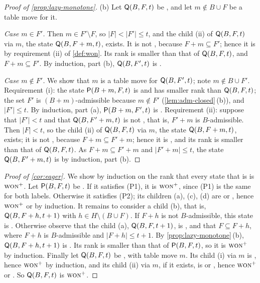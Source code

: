 \begin{proof}[Proof of \cref{prop:lazy-monotone}]
(b) Let $\mathsf{Q}(B,F,t)$ be \WON, and let $m\notin B\cup F$ be a table move for it.

\emph{Case $m\in F'$.} Then $m\in F'\setminus F$, so $|F|<|F'|\le t$, and the child \textup{(ii)} of
$\mathsf{Q}(B,F,t)$ via $m$, the state $\mathsf{Q}(B,F+m,t)$, exists. It is not \VOID, because $F+m\subseteq F'$; hence
it is \WON{} by requirement (ii) of \cref{def:won}. Its rank is smaller than that of $\mathsf{Q}(B,F,t)$,
and $F+m\subseteq F'$. By induction, part (b), $\mathsf{Q}(B,F',t)$ is \WON.

\emph{Case $m\notin F'$.} We show that $m$ is a table move for $\mathsf{Q}(B,F',t)$; note $m\notin B\cup F'$.
Requirement (i): the state $\mathsf{P}(B+m,F,t)$ is \WON{} and has smaller rank than $\mathsf{Q}(B,F,t)$; the set $F'$ is
$(B+m)$-admissible because $m\notin F'$ (\cref{lem:adm-closed}\,(b)), and $|F'|\le t$. By induction, part
(a), $\mathsf{P}(B+m,F',t)$ is \WON. Requirement (ii): suppose that $|F'|<t$ and that $\mathsf{Q}(B,F'+m,t)$ is not
\VOID, that is, $F'+m$ is $B$-admissible. Then $|F|<t$, so the child \textup{(ii)} of $\mathsf{Q}(B,F,t)$ via $m$,
the state $\mathsf{Q}(B,F+m,t)$, exists; it is not \VOID, because $F+m\subseteq F'+m$; hence it is \WON, and its
rank is smaller than that of $\mathsf{Q}(B,F,t)$. As $F+m\subseteq F'+m$ and $|F'+m|\le t$, the state
$\mathsf{Q}(B,F'+m,t)$ is \WON{} by induction, part (b).
\end{proof}

\begin{proof}[Proof of \cref{cor:eager}]
We show by induction on the rank that every state that is \WON{} is $\textup{\textsc{won}}^{+}$. Let $\mathsf{P}(B,F,t)$ be \WON. If
it satisfies (P1), it is $\textup{\textsc{won}}^{+}$, since (P1) is the same for both labels. Otherwise it satisfies (P2); its
children \textup{(a)}, \textup{(c)}, \textup{(d)} are \WON{} or \VOID, hence $\textup{\textsc{won}}^{+}$ or \VOID{} by induction.
It remains to consider a child \textup{(b)}, that is, $\mathsf{Q}(B,F+h,t+1)$ with $h\in H\setminus(B\cup F)$. If
$F+h$ is not $B$-admissible, this state is \VOID. Otherwise observe that the child \textup{(a)},
$\mathsf{Q}(B,F,t+1)$, is \WON, and that $F\subseteq F+h$, where $F+h$ is $B$-admissible and $|F+h|\le t+1$. By
\cref{prop:lazy-monotone}\,(b), $\mathsf{Q}(B,F+h,t+1)$ is \WON. Its rank is smaller than that of
$\mathsf{P}(B,F,t)$, so it is $\textup{\textsc{won}}^{+}$ by induction. Finally let $\mathsf{Q}(B,F,t)$ be \WON, with table move $m$. Its
child \textup{(i)} via $m$ is \WON, hence $\textup{\textsc{won}}^{+}$ by induction, and its child \textup{(ii)} via $m$, if it
exists, is \WON{} or \VOID, hence $\textup{\textsc{won}}^{+}$ or \VOID. So $\mathsf{Q}(B,F,t)$ is $\textup{\textsc{won}}^{+}$.
\end{proof}

